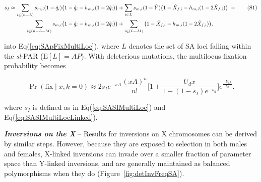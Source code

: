 \documentclass[11pt]{article}
\newcommand\numberthis{\addtocounter{equation}{1}\tag{\theequation}}
\begin{document}
\begin{align*}\label{eq:SASIMultiLocLinked}
		s_I \approx \sum_{i \in (n - L)} s_{m,i} (1 - \hat{q}_{i}) \big( 1 - \hat{q}_i - h_{m,i} (1 - 2 \hat{q}_i) \big) &+ \sum_{i \in L} s_{m,i}(1 - \hat{Y}) \big( 1 - \hat{X}_{f,i} - h_{m,i}(1 - 2 \hat{X}_{f,i}) \big)~- \numberthis\\
		\sum_{i \in (n-L-M)} s_{m,i} \big( 1 - \hat{q}_i - h_{m,i} (1 - 2 \hat{q}_i) \big) &+ \sum_{i \in (L-M)} \big( 1 - \hat{X}_{f,i} - h_{m,i}(1 - 2 \hat{X}_{f,i}) \big),
\end{align*}

\noindent into Eq(\ref{eq:SApFixMultiLoc}), where $L$ denotes the set of SA loci falling within the {\itshape sl}-PAR ($\text{E} [L] = AP$). With deleterious mutations, the multilocus fixation probability becomes

\begin{equation} \label{eq:SApFixMultiLocDelMut}
	\Pr(\text{fix} \mid x, k = 0) \approx 2 s_I e^{-xA} \frac{(xA)^n}{n!} \Bigg[ 1+ \frac{U_d x}{1 - (1-s_I)e^{-s_d}} \Bigg] e^{\frac{-					U_d x}{s_d}}.
\end{equation}

\noindent where $s_I$ is defined as in Eq(\ref{eq:SASIMultiLoc}) and Eq(\ref{eq:SASIMultiLocLinked}).
\vspace{12pt}

\vspace{12pt}

{\bf \itshape Inversions on the X} -- Results for inversions on X chromosomes can be derived by similar steps. However, because they are exposed to selection in both males and females, X-linked inversions can invade over a smaller fraction of parameter space than Y-linked inversions, and are generally maintained as balanced polymorphisms when they do (Figure~\ref{fig:detInvFreqSA}). 
\vspace{12pt}

\end{document}
